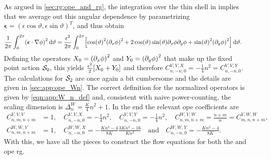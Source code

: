 As argued in \autoref{sec:rg:ope_and_rg}, the integration over the thin shell in \trspace{} implies that we average out this angular dependence by parametrizing $\bm{\epsilon} = (\epsilon\cos\vartheta, \epsilon\sin \vartheta)^T$, and thus obtain
\begin{align*}
\frac{1}{2\pi} \intx{0}{2\pi}{ \kla*{\bm{\epsilon}\cdot\nabla\phi}^2 }{\vartheta} &= \frac{\epsilon^2}{2\pi} \intx{0}{2\pi}{\klb*{\cos(\vartheta)^2 \kla*{\partial_x\phi}^2 + 2\cos(\vartheta) \sin(\vartheta) \partial_x\phi \partial_y\phi + \sin(\vartheta)^2 \kla*{\partial_y\phi}^2 }}{\vartheta}.
\end{align*}
Defining the operators $X_0 = \kla*{\partial_x\phi}^2$ and $Y_0 = \kla*{\partial_y\phi}^2$ that make up the fixed point action $\sact_0$, this yields $\frac{\epsilon^2}{2} \klb*{X_0 + Y_0}$ and therefore $C^{V,V,X}_{n,-n,0} = -\frac{1}{4}n^2 = C^{V,V,Y}_{n,-n,0}$.\\
The calculations for $\sact_2$ are once again a bit cumbersome and the details are given in \autoref{sec:app:ope_Wn}.
The correct definition for the normalized operators is given by \autoref{eqn:app:W_n_def} and, consistent with naive power-counting, the scaling dimension is $\Delta^W_n = \frac{K}{4}n^2+1$.
In the end the relevant \gls{ope} coefficients are
\begin{align*}
C^{V,V,V}_{n,m,n+m} &= 1,\quad C^{V,V,X}_{n,-n,0} = - \frac{1}{4}n^2,\quad C^{V,V,Y}_{n,-n,0} = - \frac{1}{4}n^2,\quad C^{W,V,W}_{n,m,n+m} = \frac{n+m}{n} = C^{V,W,W}_{m,n,n+m},\\
C^{W,W,V}_{n,m,n+m} &= 1,\quad C^{W,W,X}_{n,-n,0} = - \frac{Kn^2-4}{8K} \frac{3Kn^2 - 16}{Kn^2}\quad \text{and} \quad C^{W,W,Y}_{n,-n,0} = - \frac{Kn^2-4}{8K}.
\end{align*}
With this, we have all the pieces to construct the flow equations for both the \tms{} and \gls{ope} \gls{rg}.\newpage
